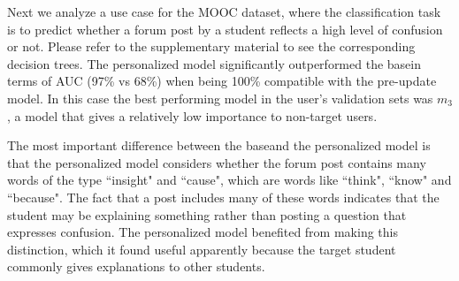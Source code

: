 \documentclass[letterpaper]{article} %
\theoremstyle{definition}
\begin{document}


%


Next we analyze a use case for the MOOC dataset, where the classification task is to predict whether a forum post by a student reflects a high level of confusion or not. Please refer to the supplementary material to see the corresponding decision trees. The personalized model significantly outperformed the basein terms of AUC (97\% vs 68\%) when being 100\% compatible with the pre-update model. In this case the best performing model in the user's validation sets was $m_3$, a model that gives a relatively low importance to non-target users.

The most important difference between the baseand the personalized model is that the personalized model considers whether the forum post contains many words of the type ``insight" and ``cause", which are words like ``think", ``know" and ``because".
The fact that a post includes many of these words indicates that the student may be explaining something rather than posting a question that expresses confusion.
The personalized model benefited from making this distinction, which it found useful apparently because the target student commonly gives explanations to other students.
\end{document}
